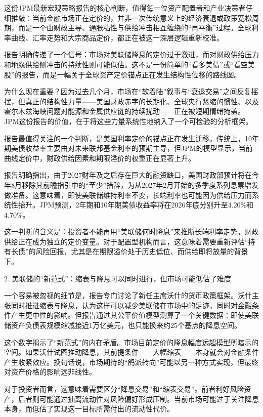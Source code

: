 \documentclass[11pt]{ctexart}
\begin{document}
这份JPM最新宏观策略报告的核心判断，值得每一位资产配置者和产业决策者仔细推敲：当前金融市场正在定价的，并非一次传统意义上的经济衰退或政策宽松周期，而是一个由财政主导、通胀粘性与供给冲击相互缠绕的“再平衡”过程。全球利率曲线、汇率走势和大宗商品定价，都正在被这一深层逻辑重新校准。

报告明确传递了一个信号：市场对美联储降息的定价过于激进，而对财政供给压力和地缘供给侧冲击的持续性则可能低估。这不是一份简单的“看多美债”或“看空美股”的报告，而是一幅关于全球资产定价锚点正在发生结构性位移的路线图。

为什么现在重要？因为过去几个月，市场在“软着陆”叙事与“衰退交易”之间反复摇摆，但真正的结构性力量——美国财政赤字的长期化、全球央行紧缩的惯性、以及霍尔木兹海峡问题对能源和金属供应链的持续扰动——正在被短期情绪掩盖。JPM这份报告的价值，在于将这些力量系统性地纳入了一个可检验的分析框架。

报告最值得关注的一个判断，是美国利率定价的锚点正在发生迁移。传统上，10年期美债收益率主要由对未来联邦基金利率的预期主导，但JPM的模型显示，当前曲线定价中，财政供给因素和期限溢价的权重正在显著上升。

报告明确指出，由于2027财年及之后存在巨大的融资缺口，美国财政部预计将在今年8月移除其前瞻指引中的“至少”措辞，为从2027年2月开始的多季度系列息票增发做准备。这意味着，即使美联储维持利率不变，长端利率也可能因为供给压力而系统性抬升。JPM预测，2年期和10年期美债收益率将在2026年底分别升至4.20\%和4.70\%。

这一判断的含义是：投资者不能再用“美联储何时降息”来推断长端利率走势。财政供给正在成为独立的定价变量。对于配置型机构而言，这意味着需要重新评估“持有长债”的风险回报，尤其是在期限溢价处于历史低位、而供给即将放量的背景下。

2. 美联储的“新范式”：缩表与降息可以同时进行，但市场可能低估了难度

一个容易被忽视的细节是，报告专门讨论了新任主席沃什的货币政策框架。沃什主张同时推进缩表与降息，认为这样可以减少美联储在市场中的足迹，同时对金融条件产生更中性的影响。但报告通过其公平价值模型测算了一个关键数据：即使美联储资产负债表规模缩减接近1万亿美元，也只能换来约25个基点的降息空间。

这个数字揭示了“新范式”的内在矛盾。市场目前定价的降息幅度远超模型所暗示的空间。如果沃什试图推动降息，其前提条件——大幅缩表——本身就会对金融条件产生收紧效应。换句话说，市场期待的“鸽派转向”可能以另一种方式实现，但最终对资产价格的影响远非线性。

对于投资者而言，这意味着需要区分“降息交易”和“缩表交易”。前者利好风险资产，后者则可能通过抽离流动性对风险偏好形成压制。当前市场可能过于关注降息本身，而低估了实现这一目标所需付出的流动性代价。
\end{document}
